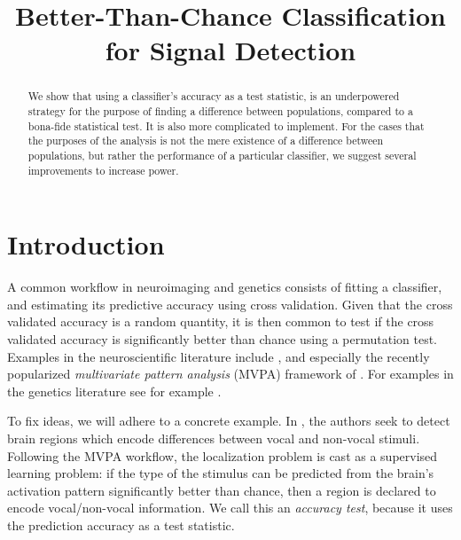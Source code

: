 \documentclass[12pt,a4paper]{article}
\title{Better-Than-Chance Classification for Signal Detection}
\begin{document}


\maketitle

\begin{abstract}
We show that using a classifier's accuracy as a test statistic, is an underpowered strategy for the purpose of finding a difference between populations, compared to a bona-fide statistical test.
It is also more complicated to implement. 
For the cases that the purposes of the analysis is not the mere existence of a difference between populations, but rather the performance of a particular classifier, we suggest several improvements to increase power. 
\end{abstract}


\section{Introduction}
\label{sec:introduction}

A common workflow in neuroimaging and genetics consists of fitting a classifier, and estimating its predictive accuracy using cross validation. 
Given that the cross validated accuracy is a random quantity, it is then common to test if the cross validated accuracy is significantly better than chance using a permutation test.  
Examples in the neuroscientific literature include \citet{golland_permutation_2003,pereira_machine_2009,varoquaux_assessing_2016}, and especially the recently popularized \emph{multivariate pattern analysis} (MVPA) framework of \citet{kriegeskorte_information-based_2006}.
For examples in the genetics literature see for example
\citet{golub_molecular_1999,slonim_class_2000,radmacher_paradigm_2002,mukherjee_estimating_2003,juan_prediction_2004,jiang_calculating_2008}.


To fix ideas, we will adhere to a concrete example.
In \cite{gilron_quantifying_2016}, the authors seek to detect brain regions which encode differences between vocal and non-vocal stimuli. 
Following the MVPA workflow, the localization problem is cast as a supervised learning problem: if the type of the stimulus can be predicted from the brain's activation pattern significantly better than chance, then a region is declared to encode vocal/non-vocal information. 
We call this an \emph{accuracy test}, because it uses the prediction accuracy as a test statistic. 
\end{document}
